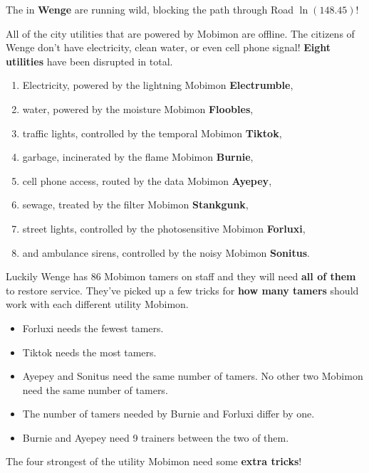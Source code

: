 

The \mappMobimon{} in \textbf{Wenge} are running wild, blocking the path
through Road \(\ln(148.45)\)!

All of the city utilities that
are powered by Mobimon are offline. The citizens of Wenge don't have
electricity, clean water, or even cell phone signal! \textbf{Eight utilities} have
been disrupted in total.
\begin{enumerate}
\item Electricity, powered by the lightning Mobimon \textbf{Electrumble},
\item water, powered by the moisture Mobimon \textbf{Floobles},
\item traffic lights, controlled by the temporal Mobimon \textbf{Tiktok},
\item garbage, incinerated by the flame Mobimon \textbf{Burnie},
\item cell phone access, routed by the data Mobimon \textbf{Ayepey},
\item sewage, treated by the filter Mobimon \textbf{Stankgunk},
\item street lights, controlled by the photosensitive Mobimon \textbf{Forluxi},
\item and ambulance sirens, controlled by the noisy Mobimon \textbf{Sonitus}.
\end{enumerate}


Luckily Wenge has 86 Mobimon tamers on staff and they will need \textbf{all of
  them} to restore service. They've picked up a few tricks for \textbf{how many
  tamers} should work with each different utility Mobimon.

\begin{itemize}
\item Forluxi needs the fewest tamers.
\item Tiktok needs the most tamers.
\item Ayepey and Sonitus need the same number of tamers. No other two Mobimon
  need the same number of tamers.
\item The number of tamers needed by Burnie and Forluxi differ by one.
\item Burnie and Ayepey need 9 trainers between the two of them.
\end{itemize}

The four strongest of the utility Mobimon need some \textbf{extra tricks}!

